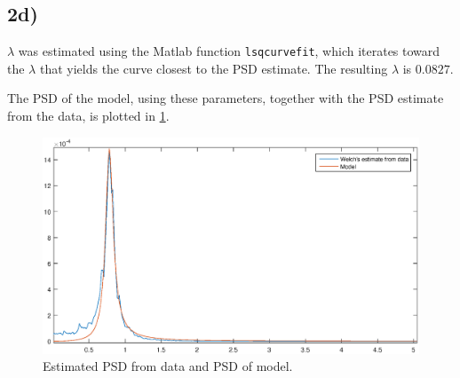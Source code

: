 \subsection{2d)}

$\lambda$ was estimated using the Matlab function \texttt{lsqcurvefit}, which iterates toward the $\lambda$ that yields the curve closest to the PSD estimate. The resulting $\lambda$ is $0.0827$.

The PSD of the model, using these parameters, together with the PSD estimate from the data, is plotted in \cref{fig:PSD}.

\begin{figure}
	\centering
	\includegraphics[width=\textwidth]{images/oppg2/PSD}
	\caption{Estimated PSD from data and PSD of model.}
	\label{fig:PSD}
\end{figure}
